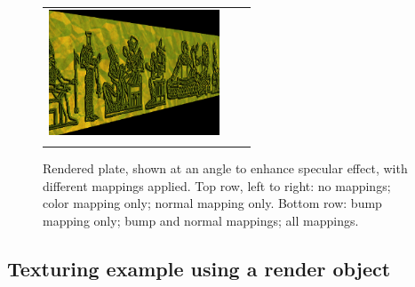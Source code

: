 \begin{figure}[ht]
\begin{center}
\begin{tabular}{ccc}
         \includegraphics[width=2in]{images/plateAllMappings}\\
      \fi
   \end{tabular}
\end{center}
\caption{Rendered plate, shown at an angle to enhance specular effect,
with different mappings applied. Top row, left to right: no mappings;
color mapping only; normal mapping only.  Bottom row: bump mapping
only; bump and normal mappings; all mappings.}
\label{mappedPlate:fig}
\end{figure}

\subsection{Texturing example using a render object}

